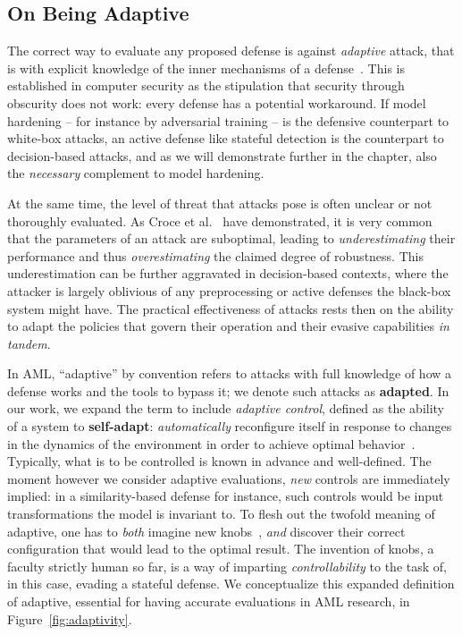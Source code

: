 \subsection{On Being Adaptive}

The correct way to evaluate any proposed defense is against \emph{adaptive} attack, that is with explicit knowledge of the inner mechanisms of a defense~\cite{tramer2020adaptive}.
This is established in computer security as the stipulation that security through obscurity does not work: every defense has a potential workaround.
If model hardening -- for instance by adversarial training -- is the defensive counterpart to white-box attacks, an active defense like stateful detection is the counterpart to decision-based attacks, and as we will demonstrate further in the chapter, also the \emph{necessary} complement to model hardening.

At the same time, the level of threat that attacks pose is often unclear or not thoroughly evaluated.
As Croce et al.~\cite{croce2020reliable} have demonstrated, it is very common that the parameters of an attack are suboptimal, leading to \textit{underestimating} their performance and thus \textit{overestimating} the claimed degree of robustness.
This underestimation can be further aggravated in decision-based contexts, where the attacker is largely oblivious of any preprocessing or active defenses the black-box system might have.
The practical effectiveness of attacks rests then on the ability to adapt the policies that govern their operation and their evasive capabilities \textit{in tandem}.

In \gls{AML}, ``adaptive'' by convention refers to attacks with full knowledge of how a defense works and the tools to bypass it; we denote such attacks as \textbf{adapted}.
In our work, we expand the term to include \textit{adaptive control}, defined as the ability of a system to \textbf{self-adapt}: \emph{automatically} reconfigure itself in response to changes in the dynamics of the environment in order to achieve optimal behavior~\cite{aastrom2013adaptive}.
Typically, what is to be controlled is known in advance and well-defined.
The moment however we consider adaptive evaluations, \textit{new} controls are immediately implied: in a similarity-based defense for instance, such controls would be input transformations the model is invariant to.
To flesh out the twofold meaning of adaptive, one has to \textit{both} imagine new knobs~\cite{hofstadter2008metamagical}, \textit{and} discover their correct configuration that would lead to the optimal result.
The invention of knobs, a faculty strictly human so far, is a way of imparting \emph{controllability} to the task of, in this case, evading a stateful defense.
We conceptualize this expanded definition of adaptive, essential for having accurate evaluations in \gls{AML} research, in Figure~\ref{fig:adaptivity}.

